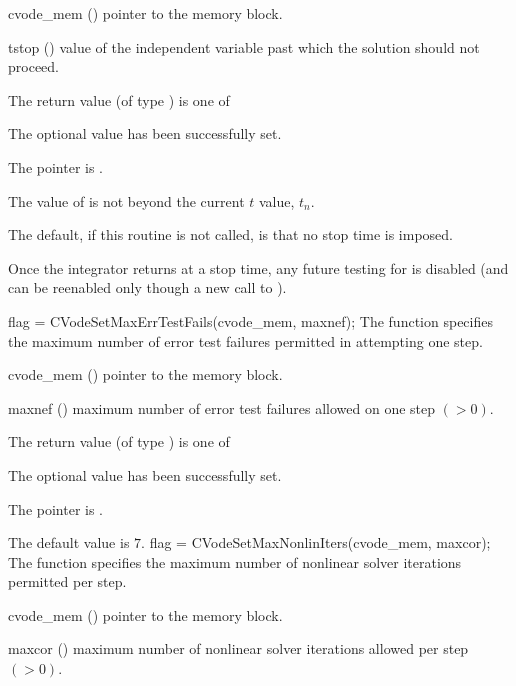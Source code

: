 {
  \begin{args}
  \item[cvode\_mem] ()
    pointer to the {\cvode} memory block.
  \item[tstop] ()
    value of the independent variable past which the solution should
    not proceed.
  \end{args}
}
{
  The return value  (of type ) is one of
  \begin{args}
  \item[\Id{CV\_SUCCESS}]
    The optional value has been successfully set.
  \item[\Id{CV\_MEM\_NULL}]
    The  pointer is .
  \item[\Id{CV\_ILL\_INPUT}]
    The value of  is not beyond the current $t$ value, $t_n$.
  \end{args}
}
{
  The default, if this routine is not called, is that no stop time is imposed.

  Once the integrator returns at a stop time, any future testing for 
  is disabled (and can be reenabled only though a new call to ).
}
{
flag = CVodeSetMaxErrTestFails(cvode\_mem, maxnef);
}
{
  The function  specifies the
  maximum number of error test failures permitted in attempting one step.
}
{
  \begin{args}
  \item[cvode\_mem] ()
    pointer to the {\cvode} memory block.
  \item[maxnef] ()
    maximum number of error test failures allowed on one step $( > 0)$.
  \end{args}
}
{
  The return value  (of type ) is one of
  \begin{args}
  \item[\Id{CV\_SUCCESS}]
    The optional value has been successfully set.
  \item[\Id{CV\_MEM\_NULL}]
    The  pointer is .
  \end{args}
}
{
  The default value is $7$.
}
{
flag = CVodeSetMaxNonlinIters(cvode\_mem, maxcor);
}
{
  The function  specifies the maximum
  number of nonlinear solver iterations permitted per step.
}
{
  \begin{args}
  \item[cvode\_mem] ()
    pointer to the {\cvode} memory block.
  \item[maxcor] ()
    maximum number of nonlinear solver iterations allowed per step $( > 0)$.
  \end{args}
}
